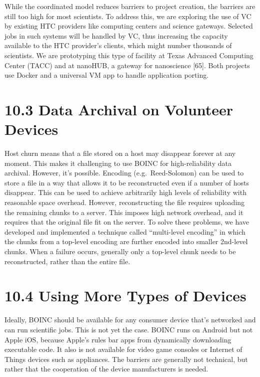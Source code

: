 \documentclass[
]{article}
\begin{document}
While the coordinated model reduces barriers to project creation, the
barriers are still too high for most scientists. To address this, we are
exploring the use of VC by existing HTC providers like computing centers
and science gateways. Selected jobs in such systems will be handled by
VC, thus increasing the capacity available to the HTC provider's
clients, which might number thousands of scientists. We are prototyping
this type of facility at Texas Advanced Computing Center (TACC) and at
nanoHUB, a gateway for nanoscience {[}65{]}. Both projects use Docker
and a universal VM app to handle application porting.

\section{10.3 Data Archival on Volunteer
Devices}\label{data-archival-on-volunteer-devices}

Host churn means that a file stored on a host may disappear forever at
any moment. This makes it challenging to use BOINC for high-reliability
data archival. However, it's possible. Encoding (e.g.~Reed-Solomon) can
be used to store a file in a way that allows it to be reconstructed even
if a number of hosts disappear. This can be used to achieve arbitrarily
high levels of reliability with reasonable space overhead. However,
reconstructing the file requires uploading the remaining chunks to a
server. This imposes high network overhead, and it requires that the
original file fit on the server. To solve these problems, we have
developed and implemented a technique called ``multi-level encoding'' in
which the chunks from a top-level encoding are further encoded into
smaller 2nd-level chunks. When a failure occurs, generally only a
top-level chunk needs to be reconstructed, rather than the entire file.

\section{10.4 Using More Types of
Devices}\label{using-more-types-of-devices}

Ideally, BOINC should be available for any consumer device that's
networked and can run scientific jobs. This is not yet the case. BOINC
runs on Android but not Apple iOS, because Apple's rules bar apps from
dynamically downloading executable code. It also is not available for
video game consoles or Internet of Things devices such as appliances.
The barriers are generally not technical, but rather that the
cooperation of the device manufacturers is needed.
\end{document}
